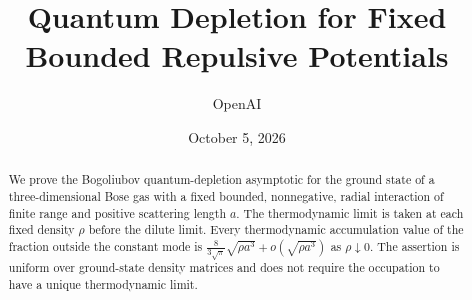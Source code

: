 \documentclass[11pt]{article}
\title{Quantum Depletion for Fixed Bounded Repulsive Potentials}
\author{OpenAI}
\date{October 5, 2026}
\theoremstyle{definition}
\theoremstyle{remark}
\numberwithin{equation}{section}
\newcommand{\1}{\mathbf 1}
\begin{document}
\maketitle
\begin{abstract}
We prove the Bogoliubov quantum-depletion asymptotic for the ground state
of a three-dimensional Bose gas with a fixed bounded, nonnegative, radial
interaction of finite range and positive scattering length $a$.
The thermodynamic limit is taken at each fixed density $\rho$ before the
dilute limit. Every thermodynamic accumulation value of the fraction
outside the constant mode is
$\frac{8}{3\sqrt\pi}\sqrt{\rho a^3}+o(\sqrt{\rho a^3})$ as
$\rho\downarrow0$. The assertion is uniform over ground-state density
matrices and does not require the occupation to have a unique
thermodynamic limit.
\end{abstract}







\begingroup
\small\raggedright


\endgroup
\end{document}
